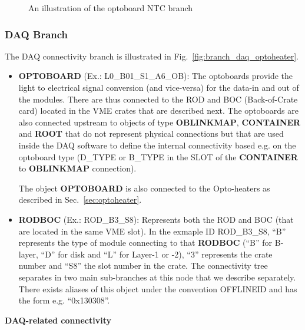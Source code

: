 \begin{figure}
\begin{center}
\end{center}
\caption{An illustration of the optoboard NTC branch}
\label{fig:branch_opto_ntc}
\end{figure}

\subsubsection{DAQ Branch}

The DAQ connectivity branch is illustrated in Fig.~\ref{fig:branch_daq_optoheater}.

\begin{itemize}
\item {\bf OPTOBOARD} (Ex.: L0\_B01\_S1\_A6\_OB): The optoboards provide the light to electrical 
signal conversion (and vice-versa) for the data-in and out of the modules. There are thus connected to the
ROD and BOC (Back-of-Crate card) located in the VME crates that are described next. The optoboards are also
connected upstream to objects of type {\bf OBLINKMAP}, {\bf CONTAINER} and {\bf ROOT} that do not 
represent physical connections but that are used inside the DAQ software to define the internal 
connectivity based e.g. on the optoboard type (D\_TYPE or B\_TYPE in the SLOT of the {\bf CONTAINER}
to {\bf OBLINKMAP} connection).

The object {\bf OPTOBOARD} is also connected to the Opto-heaters as described in Sec.~\ref{sec:optoheater}.

\item {\bf RODBOC} (Ex.: ROD\_B3\_S8): Represents both the ROD and BOC (that are located in the same
VME slot). In the exmaple ID ROD\_B3\_S8, ``B'' represents the type of module connecting to that {\bf RODBOC} (``B'' for 
B-layer, ``D'' for disk and ``L'' for Layer-1 or -2), ``3'' represents the crate number and ``S8'' 
the slot number in the crate. The connectivity tree separates in two main sub-branches at this node
that we describe separately. There exists aliases of this object under the convention OFFLINEID
and has the form e.g. ``0x130308''.
\end{itemize}

\noindent \hspace{0.2cm} {\bf \normalsize DAQ-related connectivity}

